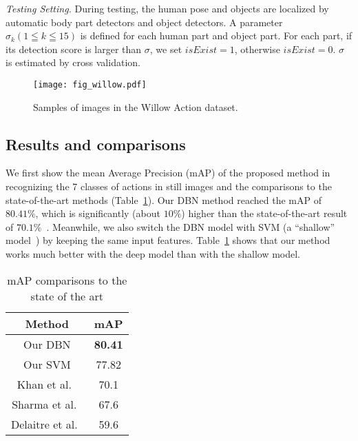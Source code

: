 \documentclass{article}
\begin{document}
\emph{Testing Setting.} During testing, the human pose and objects are localized by automatic body part detectors and object detectors.  A parameter $\sigma_k( 1 \leqq k \leqq 15)$ is defined for each human part and object part. For each part, if its detection score is larger than $\sigma$, we set $isExist = 1$, otherwise $isExist = 0$.  $\sigma$ is estimated by cross validation.

\begin{figure}[htpb]
\centering
\texttt{[image: fig\_willow.pdf]}
\vspace{-8mm}
\caption{Samples of images in the Willow Action dataset.}
\label{fig:willow}
\end{figure}

\subsection{Results and comparisons}

We first show the mean Average Precision (mAP) of the proposed method in recognizing the 7 classes of actions in still images and the comparisons to the state-of-the-art methods (Table~\ref{tab:Acc}).  Our DBN method reached the mAP of $80.41\%$, which is significantly (about $10\%$) higher than the state-of-the-art result of $70.1\%$~\cite{Khan13}.  Meanwhile, we also switch the DBN model with SVM (a ``shallow'' model~\cite{Bengio09}) by keeping the same input features.  Table~\ref{tab:Acc} shows that our method works much better with the deep model than with the shallow model.  

\begin{table}[htpb]
\small
  \centering

  \caption{mAP comparisons to the state of the art}

    \begin{tabular}{cc}
    \toprule
    Method  & mAP\\
    \midrule
    Our DBN   & \textbf{80.41} \\
    Our SVM   & 77.82 \\
    Khan et al.~\cite{Khan13} & 70.1 \\
    Sharma et al.~\cite{Sharma13} & 67.6 \\
    Delaitre et al.~\cite{Delaitre10} & 59.6\\

    \bottomrule
    \end{tabular}%
  \label{tab:Acc}%
\end{table}%
\end{document}
